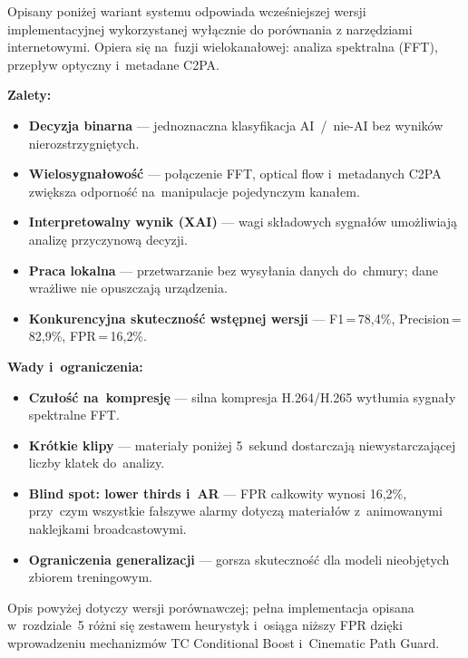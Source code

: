 Opisany poniżej wariant systemu odpowiada wcze\'{s}niejszej wersji implementacyjnej
wykorzystanej wyłącznie do porównania z narzędziami internetowymi.
Opiera się na~fuzji wielokanałowej: analiza spektralna (FFT), przepływ optyczny
i~metadane C2PA.

\textbf{Zalety:}
\begin{itemize}
  \item \textbf{Decyzja binarna} --- jednoznaczna klasyfikacja AI~/~nie-AI
        bez wynik\'{o}w nierozstrzygni\k{e}tych.
  \item \textbf{Wielosygna\l{}owo\'{s}\'{c}} --- po\l{}\k{a}czenie FFT,
        optical flow i~metadanych C2PA zwi\k{e}ksza odporno\'{s}\'{c}
        na~manipulacje pojedynczym kana\l{}em.
  \item \textbf{Interpretowalny wynik (XAI)} --- wagi sk\l{}adowych
        sygna\l{}\'{o}w umo\.{z}liwiaj\k{a} analiz\k{e} przyczynow\k{a} decyzji.
  \item \textbf{Praca lokalna} --- przetwarzanie bez wysy\l{}ania danych
        do~chmury; dane wra\.{z}liwe nie opuszczaj\k{a} urz\k{a}dzenia.
  \item \textbf{Konkurencyjna skuteczno\'{s}\'{c} wstępnej wersji} --- F1\,=\,78{,}4\%,
        Precision\,=\,82{,}9\%, FPR\,=\,16{,}2\%.
\end{itemize}

\textbf{Wady i~ograniczenia:}
\begin{itemize}
  \item \textbf{Czu\l{}o\'{s}\'{c} na~kompresj\k{e}} --- silna kompresja
        H.264/H.265 wyt\l{}umia sygna\l{}y spektralne FFT.
  \item \textbf{Kr\'{o}tkie klipy} --- materia\l{}y poni\.{z}ej 5~sekund
        dostarczaj\k{a} niewystarczaj\k{a}cej liczby klatek do~analizy.
  \item \textbf{Blind spot: lower thirds i~AR} ---
        FPR całkowity wynosi 16{,}2\%, przy~czym wszystkie fałszywe alarmy
        dotyczą materiałów z~animowanymi naklejkami broadcastowymi.
  \item \textbf{Ograniczenia generalizacji} --- gorsza skuteczno\'{s}\'{c}
        dla modeli nieobj\k{e}tych zbiorem treningowym.
\end{itemize}

\smallskip
\noindent
Opis powyżej dotyczy wersji porównawczej; pełna implementacja opisana w~rozdziale~5
różni się zestawem heurystyk i~osiąga niższy FPR dzięki wprowadzeniu mechanizmów
TC Conditional Boost i~Cinematic Path Guard.
